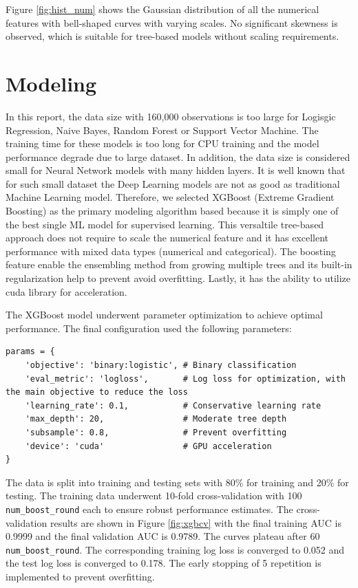 \documentclass[12pt,a4paper]{report}
\begin{document}
Figure \ref{fig:hist_num} shows the Gaussian distribution of all the numerical features with bell-shaped curves with varying scales.
No significant skewness is observed, which is suitable for tree-based models without scaling requirements.


\chapter{Modeling}

In this report, the data size with 160,000 observations is too large for Logisgic Regression, Naive Bayes, Random Forest or Support Vector Machine. The training time for these models is too long for CPU training and the model performance degrade due to large dataset.
In addition, the data size is considered small for Neural Network models with many hidden layers. It is well known that for such small dataset the Deep Learning models are not as good as traditional Machine Learning model.
Therefore, we selected XGBoost (Extreme Gradient Boosting) as the primary modeling algorithm based because it is simply one of the best single ML model for supervised learning.
This versaltile tree-based approach does not require to scale the numerical feature and it has excellent performance with mixed data types (numerical and categorical).
The boosting feature enable the ensembling method from growing multiple trees and its built-in regularization help to prevent avoid overfitting.
Lastly, it has the ability to utilize cuda library for acceleration.

The XGBoost model underwent parameter optimization to achieve optimal performance. The final configuration used the following parameters:

\begin{verbatim}
params = {
    'objective': 'binary:logistic', # Binary classification
    'eval_metric': 'logloss',       # Log loss for optimization, with the main objective to reduce the loss
    'learning_rate': 0.1,           # Conservative learning rate
    'max_depth': 20,                # Moderate tree depth
    'subsample': 0.8,               # Prevent overfitting
    'device': 'cuda'                # GPU acceleration
}
\end{verbatim}

The data is split into training and testing sets with 80\% for training and 20\% for testing.
The training data underwent 10-fold cross-validation with 100 \texttt{num\_boost\_round} each to ensure robust performance estimates. 
The cross-validation results are shown in Figure \ref{fig:xgbcv} with the final training AUC is 0.9999 and the final validation AUC is 0.9789. The curves plateau after 60 \texttt{num\_boost\_round}.
The corresponding training log loss is converged to 0.052 and the test log loss is converged to 0.178.
The early stopping of 5 repetition is implemented to prevent overfitting.
\end{document}
